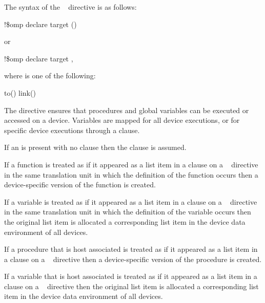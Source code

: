 \begin{samepage}

\begin{fortranspecific}
The syntax of the ~ directive is as follows:

\begin{boxedcode}
!\$omp declare target ()
\end{boxedcode}

or

\begin{boxedcode}
!\$omp declare target \plc{[clause[ [},\plc{] clause] ... ]} 
\end{boxedcode}

where  is one of the following:

\begin{indentedcodelist}
to()
link()
\end{indentedcodelist}
\end{fortranspecific}

\descr

The   directive ensures that procedures
and global variables can be executed or accessed on a device.
Variables are mapped for all device executions, or for specific
device executions through a  clause.

If an  is present with no clause then the 
clause is assumed.

\begin{ccppspecific}
If a function is treated as if it appeared as a list item in a  clause
on a ~ directive in the same translation unit in
which the definition of the function occurs then a device-specific version of
the function is created.

If a variable is treated as if it appeared as a list item in a  clause
on a ~ directive in the same translation unit in
which the definition of the variable occurs then the original list item is
allocated a corresponding list item in the device data environment of all
devices.  
\end{ccppspecific}

\begin{fortranspecific}
If a procedure that is host associated is treated as if it appeared as a
list item in a  clause on a ~ directive
then a device-specific version of the procedure is created.

If a variable that is host associated is treated as if it appeared as a
list item in a  clause on a ~ directive
then the original list item is allocated a corresponding list item in the
device data environment of all devices.
\end{fortranspecific}

\end{samepage}

